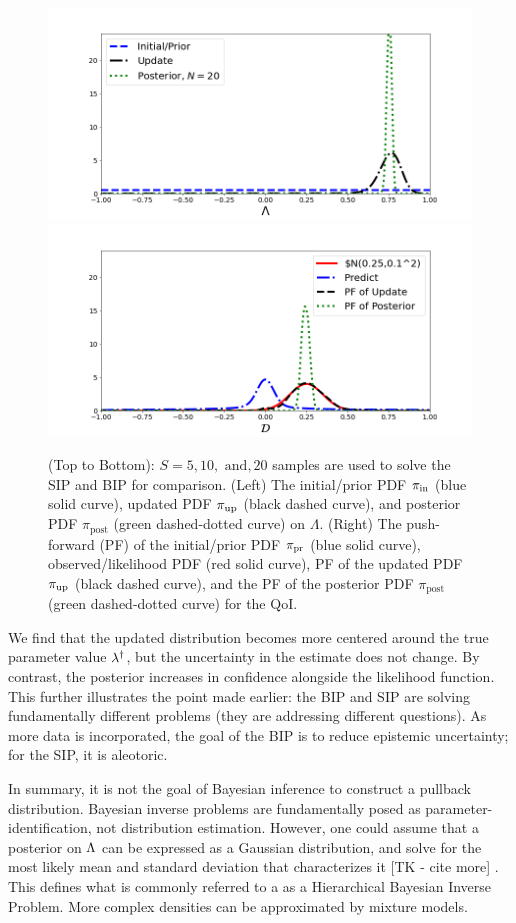 \begin{ex}
\begin{figure}[htbp]
   \includegraphics[width=0.49\linewidth]{figures/bip-vs-sip-20.png}
   \includegraphics[width=0.49\linewidth]{figures/bip-vs-sip-pf-20.png}
 \caption{(Top to Bottom): $S=5, 10, \text{ and}, 20$ samples are used to solve the SIP and BIP for comparison. (Left) The initial/prior PDF $\operatorname*{\pi_{in}}$ (blue solid curve), updated PDF $\operatorname*{\pi_{up}}$ (black dashed curve), and posterior PDF $\pi_\text{post}$ (green dashed-dotted curve) on $\Lambda$.
 (Right) The push-forward (PF) of the initial/prior PDF $\operatorname*{\pi_{pr}}$ (blue solid curve), observed/likelihood PDF (red solid curve), PF of the updated PDF $\operatorname*{\pi_{up}}$ (black dashed curve), and the PF of the posterior PDF $\pi_\text{post}$ (green dashed-dotted curve) for the QoI.}
 \label{fig:bayes-comparison-convergence}
\end{figure}

We find that the updated distribution becomes more centered around the true parameter value $\lambda^\dagger$, but the uncertainty in the estimate does not change.
By contrast, the posterior increases in confidence alongside the likelihood function.
This further illustrates the point made earlier: the BIP and SIP are solving fundamentally different problems (they are addressing different questions).
As more data is incorporated, the goal of the BIP is to reduce epistemic uncertainty; for the SIP, it is aleotoric.
\end{ex}





In summary, it is not the goal of Bayesian inference to construct a pullback distribution.
Bayesian inverse problems are fundamentally posed as parameter-identification, not distribution estimation.
However, one could assume that a posterior on ${\Lambda}$ can be expressed as a Gaussian distribution, and solve for the most likely mean and standard deviation that characterizes it [TK - cite more] \cite{Smith}.
This defines what is commonly referred to a as a Hierarchical Bayesian Inverse Problem.
More complex densities can be approximated by mixture models.

